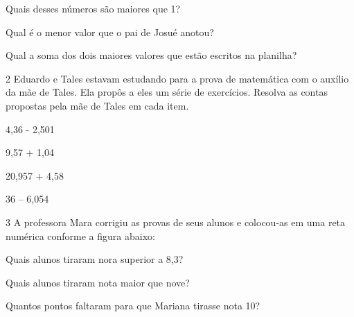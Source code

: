 
\begin{escolha}
\item
  Quais desses números são maiores que 1?


\item
  Qual é o menor valor que o pai de Josué anotou?


\item
  Qual a soma dos dois maiores valores que estão escritos na planilha?

\end{escolha}


\num{2} Eduardo e Tales estavam estudando para a prova de matemática com o
auxílio da mãe de Tales. Ela propôs a eles um série de exercícios.
Resolva as contas propostas pela mãe de Tales em cada item.

\begin{escolha}
\item
  4,36 - 2,501


\item
  9,57 + 1,04


\item
  20,957 + 4,58


\item
  36 -- 6,054

\end{escolha}


\num{3} A professora Mara corrigiu as provas de seus alunos e colocou-as em
uma reta numérica conforme a figura abaixo:


\begin{escolha}
\item
  Quais alunos tiraram nora superior a 8,3?


\item
  Quais alunos tiraram nota maior que nove?


\item
  Quantos pontos faltaram para que Mariana tirasse nota 10?

\end{escolha}

